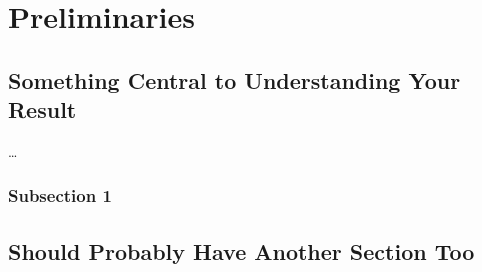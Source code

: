 \documentclass[../thesis.tex]{subfiles}
\begin{document}
\chapter{Preliminaries}
\label{ch:prelim}
\section{Something Central to Understanding Your Result}
\ldots
\lipsum[9]
\subsection{Subsection 1}
\lipsum[10]
\section{Should Probably Have Another Section Too}
\lipsum[11]
\end{document}
